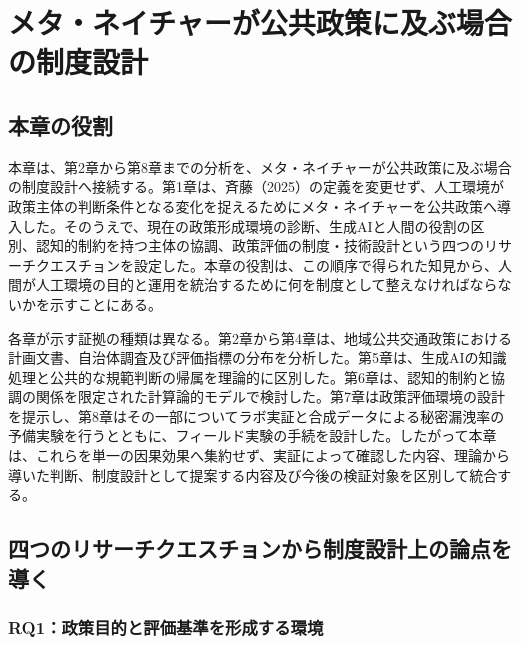 
\chapter{メタ・ネイチャーが公共政策に及ぶ場合の制度設計}
\label{chap:institutional_design}

\begin{center}
\end{center}

\section{本章の役割}
\label{sec:ch9_role}

本章は、第2章から第8章までの分析を、メタ・ネイチャーが公共政策に及ぶ場合の制度設計へ接続する。第1章は、斉藤（2025）の定義を変更せず、人工環境が政策主体の判断条件となる変化を捉えるためにメタ・ネイチャーを公共政策へ導入した\cite{saito2025metanature}。そのうえで、現在の政策形成環境の診断、生成AIと人間の役割の区別、認知的制約を持つ主体の協調、政策評価の制度・技術設計という四つのリサーチクエスチョンを設定した。本章の役割は、この順序で得られた知見から、人間が人工環境の目的と運用を統治するために何を制度として整えなければならないかを示すことにある。

各章が示す証拠の種類は異なる。第2章から第4章は、地域公共交通政策における計画文書、自治体調査及び評価指標の分布を分析した。第5章は、生成AIの知識処理と公共的な規範判断の帰属を理論的に区別した。第6章は、認知的制約と協調の関係を限定された計算論的モデルで検討した。第7章は政策評価環境の設計を提示し、第8章はその一部についてラボ実証と合成データによる秘密漏洩率の予備実験を行うとともに、フィールド実験の手続を設計した。したがって本章は、これらを単一の因果効果へ集約せず、実証によって確認した内容、理論から導いた判断、制度設計として提案する内容及び今後の検証対象を区別して統合する。

\section{四つのリサーチクエスチョンから制度設計上の論点を導く}
\label{sec:ch9_integration}

\subsection{RQ1：政策目的と評価基準を形成する環境}


